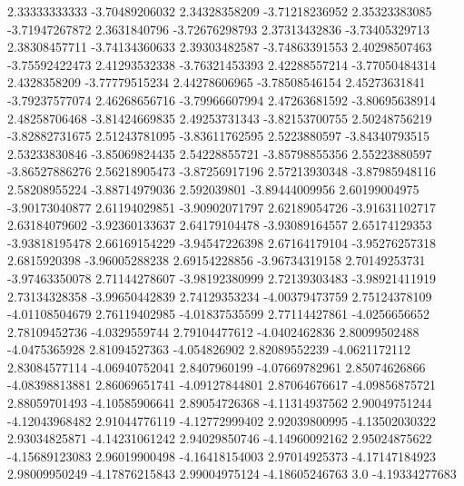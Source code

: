   2.33333333333   -3.70489206032
  2.34328358209   -3.71218236952
  2.35323383085   -3.71947267872
   2.3631840796   -3.72676298793
  2.37313432836   -3.73405329713
  2.38308457711   -3.74134360633
  2.39303482587   -3.74863391553
  2.40298507463   -3.75592422473
  2.41293532338   -3.76321453393
  2.42288557214   -3.77050484314
   2.4328358209   -3.77779515234
  2.44278606965   -3.78508546154
  2.45273631841   -3.79237577074
  2.46268656716   -3.79966607994
  2.47263681592   -3.80695638914
  2.48258706468   -3.81424669835
  2.49253731343   -3.82153700755
  2.50248756219   -3.82882731675
  2.51243781095   -3.83611762595
   2.5223880597   -3.84340793515
  2.53233830846   -3.85069824435
  2.54228855721   -3.85798855356
  2.55223880597   -3.86527886276
  2.56218905473   -3.87256917196
  2.57213930348   -3.87985948116
  2.58208955224   -3.88714979036
    2.592039801   -3.89444009956
  2.60199004975   -3.90173040877
  2.61194029851   -3.90902071797
  2.62189054726   -3.91631102717
  2.63184079602   -3.92360133637
  2.64179104478   -3.93089164557
  2.65174129353   -3.93818195478
  2.66169154229   -3.94547226398
  2.67164179104   -3.95276257318
   2.6815920398   -3.96005288238
  2.69154228856   -3.96734319158
  2.70149253731   -3.97463350078
  2.71144278607   -3.98192380999
  2.72139303483   -3.98921411919
  2.73134328358   -3.99650442839
  2.74129353234   -4.00379473759
  2.75124378109   -4.01108504679
  2.76119402985   -4.01837535599
  2.77114427861    -4.0256656652
  2.78109452736    -4.0329559744
  2.79104477612    -4.0402462836
  2.80099502488    -4.0475365928
  2.81094527363     -4.054826902
  2.82089552239    -4.0621172112
  2.83084577114   -4.06940752041
   2.8407960199   -4.07669782961
  2.85074626866   -4.08398813881
  2.86069651741   -4.09127844801
  2.87064676617   -4.09856875721
  2.88059701493   -4.10585906641
  2.89054726368   -4.11314937562
  2.90049751244   -4.12043968482
  2.91044776119   -4.12772999402
  2.92039800995   -4.13502030322
  2.93034825871   -4.14231061242
  2.94029850746   -4.14960092162
  2.95024875622   -4.15689123083
  2.96019900498   -4.16418154003
  2.97014925373   -4.17147184923
  2.98009950249   -4.17876215843
  2.99004975124   -4.18605246763
            3.0   -4.19334277683
